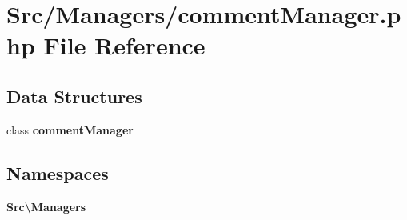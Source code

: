 \section{Src/\+Managers/comment\+Manager.php File Reference}
\label{comment_manager_8php}
\subsection*{Data Structures}
\begin{DoxyCompactItemize}
\item 
class \textbf{ comment\+Manager}
\end{DoxyCompactItemize}
\subsection*{Namespaces}
\begin{DoxyCompactItemize}
\item 
 \textbf{ Src\textbackslash{}\+Managers}
\end{DoxyCompactItemize}
